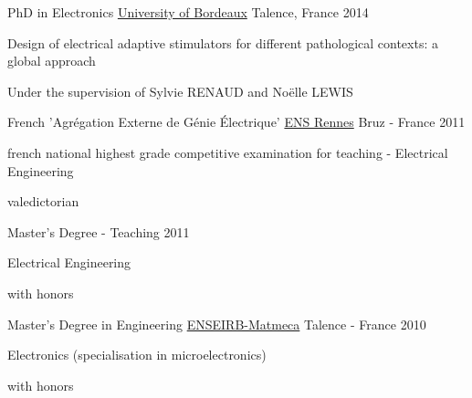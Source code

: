 

\begin{cventries}

  \cventry
    {PhD in Electronics} %
    {\href{https://ed-spi.u-bordeaux.fr}{University of Bordeaux}} %
    {Talence, France} %
    {2014} %
    {
      \begin{cvitems} %
        \item {Design of electrical adaptive stimulators for different pathological contexts: a global approach}
        \item {Under the supervision of Sylvie RENAUD and Noëlle LEWIS}
      \end{cvitems}
    }
    
  \cventry
    {French 'Agrégation Externe de Génie Électrique'} %
    {\href{https://www.ens-rennes.fr}{ENS Rennes}} %
    {Bruz - France} %
    {2011} %
    {
      \begin{cvitems} %
        \item {french national highest grade competitive examination for teaching - Electrical Engineering}
        \item {valedictorian} 
      \end{cvitems}
    }
    
  \cventry
    {Master's Degree - Teaching} %
    {} %
    {} %
    {2011} %
    {
      \begin{cvitems} %
        \item {Electrical Engineering}
        \item {with honors}
      \end{cvitems}
    }
    
  \cventry
    {Master's Degree in Engineering} %
    {\href{https://enseirb-matmeca.bordeaux-inp.fr/en}{ENSEIRB-Matmeca}} %
    {Talence - France} %
    {2010} %
    {
      \begin{cvitems} %
        \item {Electronics (specialisation in microelectronics)}
        \item {with honors}
      \end{cvitems}
    }
   

\end{cventries}
